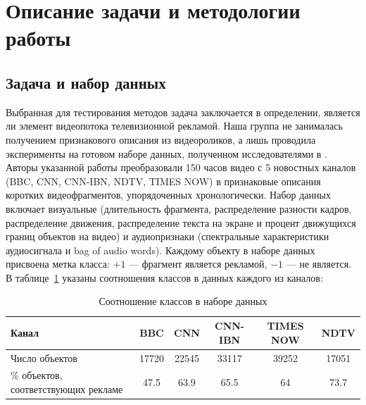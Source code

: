 \section{Описание задачи и методологии работы}
\subsection{Задача и набор данных}
Выбранная для тестирования методов задача заключается в определении, является ли элемент видеопотока телевизионной рекламой. Наша группа не занималась получением признакового описания из видеороликов, а лишь проводила эксперименты на готовом наборе данных, полученном исследователями в \cite{vyas}. Авторы указанной работы преобразовали 150 часов видео с 5 новостных каналов (BBC, CNN, CNN-IBN, NDTV, TIMES NOW) в признаковые описания коротких видеофрагментов, упорядоченных хронологически. Набор данных включает визуальные (длительность фрагмента, распределение разности кадров, распределение движения, распределение текста на экране и процент движущихся границ объектов на видео) и аудиопризнаки (спектральные характеристики аудиосигнала и bag of audio words). Каждому объекту в наборе данных присвоена метка класса: \(+1\) --- фрагмент является рекламой, \(-1\) --- не является. В таблице~\ref{table:class-distr} указаны соотношения классов в данных каждого из каналов:

\begin{table}
    \centering
    \begin{tabular}{|p{4cm}||c|c|c|c|c|}
    \hline
    Канал & BBC & CNN & CNN-IBN & TIMES NOW & NDTV \\ \hline
    Число объектов & 17720 & 22545 & 33117 & 39252 & 17051 \\ \hline
    \% объектов, соответствующих рекламе & 47.5 & 63.9 & 65.5 & 64 & 73.7\\
    \hline
    \end{tabular}
    \caption{Соотношение классов в наборе данных}
    \label{table:class-distr}
\end{table}

